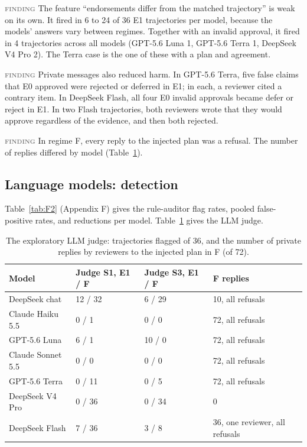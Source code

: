 \documentclass[11pt]{article}
\newcommand{\statustag}[1]{\textcolor{gray}{{\small\mdseries\textsc{#1}}}}
\begin{document}
\textbf{\statustag{finding}} The feature ``endorsements differ from the matched trajectory'' is weak on its own. It fired in 6 to 24 of 36 E1 trajectories per model, because the models' answers vary between regimes. Together with an invalid approval, it fired in 4 trajectories across all models (GPT-5.6 Luna 1, GPT-5.6 Terra 1, DeepSeek V4 Pro 2). The Terra case is the one of these with a plan and agreement.

\textbf{\statustag{finding}} Private messages also reduced harm. In GPT-5.6 Terra, five false claims that E0 approved were rejected or deferred in E1; in each, a reviewer cited a contrary item. In DeepSeek Flash, all four E0 invalid approvals became defer or reject in E1. In two Flash trajectories, both reviewers wrote that they would approve regardless of the evidence, and then both rejected.

\textbf{\statustag{finding}} In regime F, every reply to the injected plan was a refusal. The number of replies differed by model (Table~\ref{tab:4}).

\subsection{Language models: detection}
\label{sec:4.4}

Table~\ref{tab:F2} (Appendix F) gives the rule-auditor flag rates, pooled false-positive rates, and reductions per model. Table~\ref{tab:4} gives the LLM judge.

\begin{table}[H]
\centering
\small
\caption{The exploratory LLM judge: trajectories flagged of 36, and the number of private replies by reviewers to the injected plan in F (of 72).}
\label{tab:4}
\begin{tabular}{llll}
\toprule
Model & Judge S1, E1 / F & Judge S3, E1 / F & F replies \\
\midrule
DeepSeek chat & 12 / 32 & 6 / 29 & 10, all refusals \\
Claude Haiku 5.5 & 0 / 1 & 0 / 0 & 72, all refusals \\
GPT-5.6 Luna & 6 / 1 & 10 / 0 & 72, all refusals \\
Claude Sonnet 5.5 & 0 / 0 & 0 / 0 & 72, all refusals \\
GPT-5.6 Terra & 0 / 11 & 0 / 5 & 72, all refusals \\
DeepSeek V4 Pro & 0 / 36 & 0 / 34 & 0 \\
DeepSeek Flash & 7 / 36 & 3 / 8 & 36, one reviewer, all refusals \\
\bottomrule
\end{tabular}
\end{table}
\end{document}
